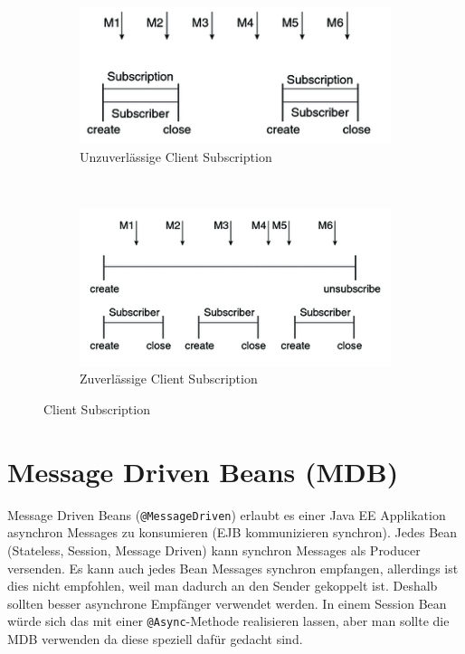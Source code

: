 \begin{figure}
	\centering
	\begin{subfigure}[b]{0.4\textwidth}
		\includegraphics[width=\textwidth]{fig/jms-nondurableSubscriber}
		\caption{Unzuverlässige Client Subscription}
		\label{fig:jms-nondurable-subscriber}
	\end{subfigure}
	~
	\begin{subfigure}[b]{0.4\textwidth}
		\includegraphics[width=\textwidth]{fig/jms-durableSubscriber}
		\caption{Zuverlässige Client Subscription}
		\label{fig:jms-durable-subscriber}
	\end{subfigure}
	\caption{Client Subscription}
\end{figure} 

\section{Message Driven Beans (MDB)}

Message Driven Beans (\verb|@MessageDriven|) erlaubt es einer Java EE Applikation asynchron Messages zu konsumieren (EJB kommunizieren synchron). Jedes Bean (Stateless, Session, Message Driven) kann synchron Messages als Producer versenden. Es kann auch jedes Bean Messages synchron empfangen, allerdings ist dies nicht empfohlen, weil man dadurch an den Sender gekoppelt ist. Deshalb sollten besser asynchrone Empfänger verwendet werden. In einem Session Bean würde sich das mit einer \verb|@Async|-Methode realisieren lassen, aber man sollte die MDB verwenden da diese speziell dafür gedacht sind.

